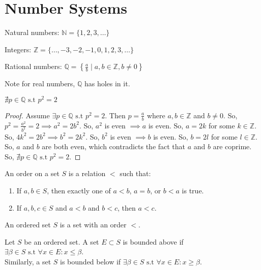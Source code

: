 \chapter{Number Systems}

Natural numbers: $\mathbb{N} = \{1, 2, 3, \ldots\}$
\par
Integers: $\mathbb{Z} = \{\ldots, -3, -2, -1, 0, 1, 2, 3, \ldots\}$
\par
Rational numbers: $\mathbb{Q} = \left\{\frac{a}{b} \mid a, b \in \mathbb{Z}, b \neq 0\right\}$\par

\begin{remark}
	Note for real numbers, $\mathbb{Q}$ has holes in it.
	\begin{example}
		$\nexists{p \in  \mathbb{Q}} \text{ s.t } p^2=2$\\
		\begin{proof}
			Assume $\exists{p \in \mathbb{Q}} \text{ s.t } p^2=2$. Then $p = \frac{a}{b}$ where $a, b \in \mathbb{Z}$ and $b \neq 0$. So, $p^2 = \frac{a^2}{b^2} = 2 \implies a^2 = 2b^2$. So, $a^2$ is even $\implies a$ is even. So, $a = 2k$ for some $k \in \mathbb{Z}$. So, $4k^2 = 2b^2 \implies b^2 = 2k^2$. So, $b^2$ is even $\implies b$ is even. So, $b = 2l$ for some $l \in \mathbb{Z}$. So, $a$ and $b$ are both even, which contradicts the fact that $a$ and $b$ are coprime. So, $\nexists{p \in \mathbb{Q}} \text{ s.t } p^2=2$.
		\end{proof}
	\end{example}
\end{remark}


\begin{definition}[Order]
	An order on a set $S$ is a relation $<$ such that:
	\begin{enumerate}
		\item If $a, b \in S$, then exactly one of $a < b$, $a = b$, or $b < a$ is true.
		\item If $a, b, c \in S$ and $a < b$ and $b < c$, then $a < c$.
	\end{enumerate}
\end{definition}


\begin{definition}
	An ordered set $S$ is a set with an order $<$.
\end{definition}

\begin{definition}
	Let $S$ be an ordered set.
	A set $E\subset S$ is bounded above if $\exists{\beta \in S} \text{ s.t } \forall{x \in E}: x \leq \beta$.\\
	Similarly, a set $S$ is bounded below if $\exists{\beta \in S} \text{ s.t } \forall{x \in E}: x \geq \beta$.
\end{definition}

